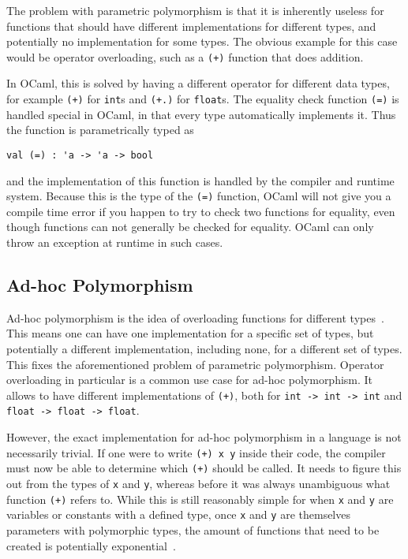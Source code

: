 The problem with parametric polymorphism is that it is inherently useless for functions that should have different implementations for different types, and potentially no implementation for some types. The obvious example for this case would be operator overloading, such as a \verb|(+)| function that does addition.

In OCaml, this is solved by having a different operator for different data types, for example \verb|(+)| for \verb|int|s and \verb|(+.)| for \verb|float|s. The equality check function \verb|(=)| is handled special in OCaml, in that every type automatically implements it. Thus the function is parametrically typed as
\begin{verbatim}
val (=) : 'a -> 'a -> bool
\end{verbatim}
and the implementation of this function is handled by the compiler and runtime system. Because this is the type of the \verb|(=)| function, OCaml will not give you a compile time error if you happen to try to check two functions for equality, even though functions can not generally be checked for equality. OCaml can only throw an exception at runtime in such cases.

\subsection{Ad-hoc Polymorphism}\label{ad-hoc-polymorphism}

Ad-hoc polymorphism is the idea of overloading functions for different types~\cite[Chapter~23.2]{pierce-types}. This means one can have one implementation for a specific set of types, but potentially a different implementation, including none, for a different set of types. This fixes the aforementioned problem of parametric polymorphism. Operator overloading in particular is a common use case for ad-hoc polymorphism. It allows to have different implementations of \verb|(+)|, both for \verb|int -> int -> int| and \verb|float -> float -> float|.

However, the exact implementation for ad-hoc polymorphism in a language is not necessarily trivial. If one were to write \verb|(+) x y| inside their code, the compiler must now be able to determine which \verb|(+)| should be called. It needs to figure this out from the types of \verb|x| and \verb|y|, whereas before it was always unambiguous what function \verb|(+)| refers to. While this is still reasonably simple for when \verb|x| and \verb|y| are variables or constants with a defined type, once \verb|x| and \verb|y| are themselves parameters with polymorphic types, the amount of functions that need to be created is potentially exponential~\cite{type-classes-original}.


